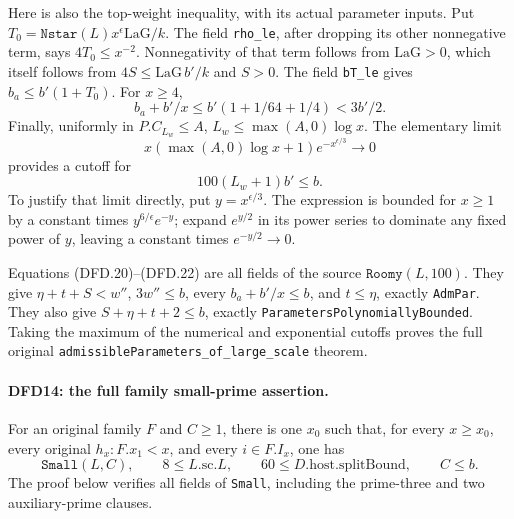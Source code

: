 Here is also the top-weight inequality, with its actual
parameter inputs. Put
$T_0=\texttt{Nstar}(L)x^\epsilon\mathrm{LaG}/k$.
The field \texttt{rho\_\allowbreak le}, after dropping its other
nonnegative term, says $4T_0\le x^{-2}$. Nonnegativity
of that term follows from $\mathrm{LaG}>0$, which itself
follows from $4S\le\mathrm{LaG}\,b'/k$ and $S>0$.
The field \texttt{b\allowbreak T\_\allowbreak le} gives $b_a\le b'(1+T_0)$.
For $x\ge4$,
\[
        b_a+b'/x\le b'(1+1/64+1/4)<3b'/2.              \tag{DFD.21}
\]
Finally, uniformly in $P.C_{L_w}\le A$,
$L_w\le\max(A,0)\log x$. The elementary limit
\[
 x(\max(A,0)\log x+1)e^{-x^{\epsilon/3}}\longrightarrow0
\]
provides a cutoff for
\[
              100(L_w+1)b'\le b.                       \tag{DFD.22}
\]
To justify that limit directly, put $y=x^{\epsilon/3}$.
The expression is bounded for $x\ge1$ by a constant
times $y^{6/\epsilon}e^{-y}$; expand $e^{y/2}$ in its
power series to dominate any fixed power of $y$, leaving
a constant times $e^{-y/2}\to0$.

Equations (DFD.20)--(DFD.22) are all fields of the source
$\texttt{Roomy}(L,100)$. They give
$\eta+t+S<w''$, $3w''\le b$, every
$b_a+b'/x\le b$, and $t\le\eta$, exactly
\texttt{Adm\allowbreak Par}. They also give $S+\eta+t+2\le b$,
exactly \texttt{Parameters\allowbreak Polynomially\allowbreak Bounded}. Taking
the maximum of the numerical and exponential cutoffs
proves the full original
\texttt{admissible\allowbreak Parameters\_\allowbreak of\_\allowbreak large\_\allowbreak scale} theorem.

\paragraph{DFD14: the full family small-prime assertion.}
\label{claim:DFD14}
For an original family $F$ and $C\ge1$, there is one
$x_0$ such that, for every $x\ge x_0$, every original
$h_x:F.x_1<x$, and every $i\in F.I_x$, one has
\[
 \texttt{Small}(L,C),\qquad8\le L.\mathrm{sc}.L,
 \qquad60\le D.\mathrm{host}.\mathrm{splitBound},
 \qquad C\le b.                                        \tag{DFD.23}
\]
The proof below verifies all fields of \texttt{Small},
including the prime-three and two auxiliary-prime clauses.


